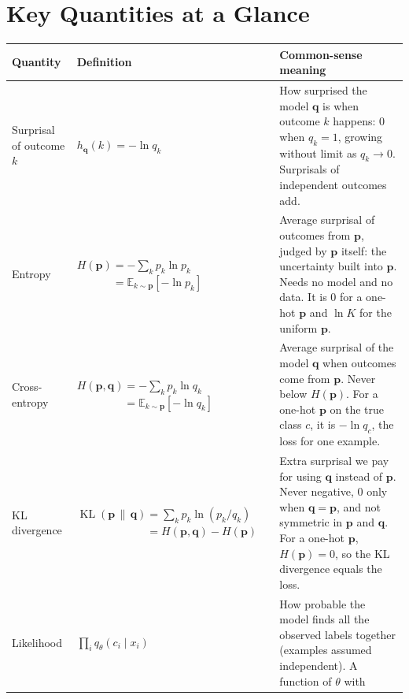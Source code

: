 \documentclass[12pt]{article}
\numberwithin{equation}{section} %
\newcommand{\vc}[1]{\symbf{#1}}
\begin{document}
\newpage
\section{Key Quantities at a Glance}
\begin{table}[htbp]
  \centering
  \small
  \renewcommand{\arraystretch}{1.15}
  \begin{tabular}{@{}>{\raggedright\arraybackslash}p{2.5cm}>{\raggedright\arraybackslash}p{5.4cm}>{\raggedright\arraybackslash}p{6.8cm}@{}}
    \toprule
    \textbf{Quantity} & \textbf{Definition} & \textbf{Common-sense meaning} \\
    \midrule
    Surprisal of outcome $k$
      & $h_{\vc{q}}(k) = -\ln q_k$
      & How surprised the model $\vc{q}$ is when outcome $k$ happens:
        $0$ when $q_k = 1$, growing without limit as $q_k \to 0$.
        Surprisals of independent outcomes add. \\[5pt]
    Entropy
      & $H(\vc{p}) = -\sum_k p_k \ln p_k$ \newline
        $\phantom{H(\vc{p})} = \mathbb{E}_{k\sim\vc{p}}[-\ln p_k]$
      & Average surprisal of outcomes from $\vc{p}$, judged by
        $\vc{p}$ itself: the uncertainty built into $\vc{p}$. Needs
        no model and no data. It is $0$ for a one-hot $\vc{p}$ and
        $\ln K$ for the uniform $\vc{p}$. \\[5pt]
    Cross-entropy
      & $H(\vc{p},\vc{q}) = -\sum_k p_k \ln q_k$ \newline
        $\phantom{H(\vc{p},\vc{q})} = \mathbb{E}_{k\sim\vc{p}}[-\ln q_k]$
      & Average surprisal of the model $\vc{q}$ when outcomes come
        from $\vc{p}$. Never below $H(\vc{p})$. For a one-hot
        $\vc{p}$ on the true class $c$, it is $-\ln q_c$, the loss
        for one example. \\[5pt]
    KL divergence
      & $\operatorname{KL}(\vc{p}\,\|\,\vc{q}) = \sum_k p_k \ln (p_k/q_k)$ \newline
        $\phantom{\operatorname{KL}(\vc{p}\,\|\,\vc{q})} = H(\vc{p},\vc{q}) - H(\vc{p})$
      & Extra surprisal we pay for using $\vc{q}$ instead of $\vc{p}$.
        Never negative, $0$ only when $\vc{q} = \vc{p}$, and not
        symmetric in $\vc{p}$ and $\vc{q}$. For a one-hot $\vc{p}$,
        $H(\vc{p}) = 0$, so the KL divergence equals the loss. \\[5pt]
    Likelihood
      & $\prod_{i} q_\theta(c_i \mid x_i)$
      & How probable the model finds all the observed labels together
        (examples assumed independent). A function of $\theta$ with

\end{tabular}
\end{table}
\end{document}
